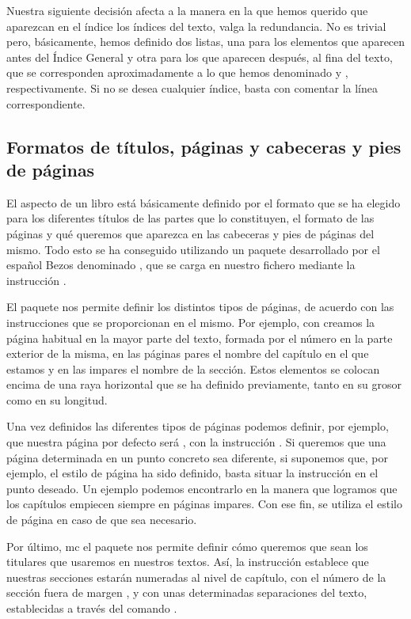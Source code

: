 Nuestra siguiente decisión afecta a la manera en la que hemos querido que aparezcan en el índice los índices del texto, valga la redundancia. No es trivial pero, básicamente, hemos definido dos listas, una para los elementos que aparecen antes del Índice General y otra para los  que aparecen después, al fina del texto, que se corresponden aproximadamente a lo que hemos denominado  y , respectivamente. Si no se desea cualquier índice, basta con comentar la línea correspondiente.

\subsection{Formatos de títulos, páginas y cabeceras y pies de páginas}
El aspecto de un libro está básicamente definido por el formato que se ha elegido para los diferentes títulos de las partes que lo constituyen, el formato de las páginas y qué queremos que aparezca en las cabeceras y pies de páginas del mismo. Todo esto se ha conseguido utilizando un paquete desarrollado por el español Bezos denominado , que se carga en nuestro fichero mediante la instrucción .

El paquete nos permite definir los distintos tipos de páginas, de acuerdo con las instrucciones que se proporcionan en el mismo. Por ejemplo, con  creamos la página habitual en la mayor parte del texto, formada por el número en la parte exterior de la misma, en las páginas pares el nombre del capítulo en el que estamos y en las impares el nombre de la sección. Estos elementos se colocan encima de una raya horizontal que se ha definido previamente, tanto en su grosor como en su longitud.

Una vez definidos las diferentes tipos de páginas podemos definir, por ejemplo, que nuestra página por defecto será , con la instrucción . Si queremos que una página determinada en un punto concreto sea diferente, si suponemos que, por ejemplo, el estilo de página  ha sido definido, basta situar la instrucción  en el punto deseado. Un ejemplo podemos encontrarlo en la manera que logramos que los capítulos empiecen siempre en páginas impares. Con ese fin, se utiliza el estilo de página  en caso de que sea necesario.

Por último, \acrshort{mc} el paquete  nos permite definir cómo queremos que sean los titulares que usaremos en nuestros textos. Así,  la instrucción  establece que nuestras secciones estarán numeradas al nivel de capítulo, con el número de la sección fuera de margen , y con unas determinadas separaciones del texto, establecidas a través del comando . 

